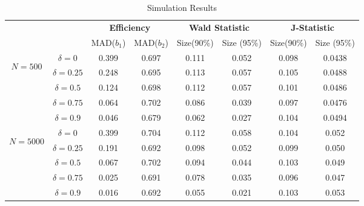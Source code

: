\documentclass[11pt, fleqn]{article}
\begin{document}
\begin{table}
	\centering
	\small
	\caption{Simulation Results}
	\vspace{5pt}
	
	\begin{tabular}{|cc|cc|cc|cc|}
		
		\hline
		& & \multicolumn{2}{c|}{\textbf{Efficiency}} & \multicolumn{2}{c|}{\textbf{Wald Statistic }} & \multicolumn{2}{c|}{\textbf{J-Statistic}}  \\
		
		& & \multicolumn{1}{c}{MAD($b_1$)}& \multicolumn{1}{c|}{MAD($b_2$)}
		&  \multicolumn{1}{c}{Size(90\%)}  & \multicolumn{1}{c|}{Size (95\%)}
		&  \multicolumn{1}{c}{Size(90\%)}  & \multicolumn{1}{c|}{Size (95\%)}
		\\ \hline
		
		
		\multirow{4}{*}{\begin{sideways}\parbox{2cm}{\centering $N=500$}\end{sideways}}
		
		
		
		&\hspace{-0.6cm}$\delta=0$      & 0.399 &0.697   &0.111  &0.052 &0.098&0.0438       \\  [0.18cm]
		&\hspace{-0.3cm}$\delta=0.25$   & 0.248 &0.695   &0.113  &0.057 &0.105&0.0488     \\ [0.18cm]
		&\hspace{-0.35cm}$\delta=0.5$   & 0.124 &0.698   &0.112  &0.057 &0.101& 0.0486      \\  [0.18cm]
		&\hspace{-0.20cm}$\delta=0.75$  & 0.064 &0.702   &0.086  &0.039 &0.097& 0.0476       \\ [0.18cm]
		&\hspace{-0.4cm}$\delta=0.9$    & 0.046 &0.679   &0.062  &0.027 &0.104&0.0494        \\ [0.18cm]
		\hline
		
		
		\multirow{4}{*}{\begin{sideways}\parbox{2cm}{\centering $N=5000$}\end{sideways}}
		
		
		
		&\hspace{-0.6cm}$\delta=0$      & 0.399 &0.704   &0.112  &0.058 &0.104&0.052      \\  [0.18cm]
		&\hspace{-0.3cm}$\delta=0.25$   &  0.191 &0.692   &0.098  &0.052 &0.099&0.050     \\ [0.18cm]
		&\hspace{-0.35cm}$\delta=0.5$   &  0.067 &0.702   &0.094  &0.044 &0.103&0.049      \\  [0.18cm]
		&\hspace{-0.20cm}$\delta=0.75$  &  0.025 &0.691   &0.078  &0.035 &0.096&0.047       \\ [0.18cm]
		&\hspace{-0.4cm}$\delta=0.9$    &  0.016 &0.692   &0.055  &0.021 &0.103&0.053    \\ [0.18cm]
		

\end{tabular}
\end{table}
\end{document}

